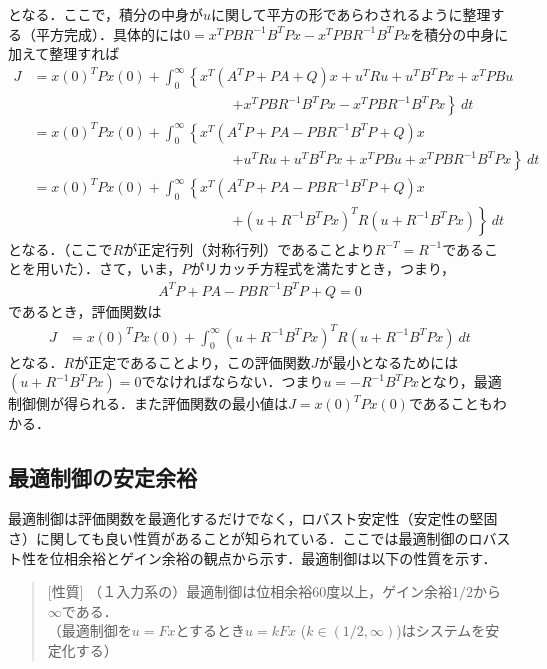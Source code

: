 となる．ここで，積分の中身が$u$に関して平方の形であらわされるように整理する（平方完成）．具体的には$0=x^T P B R^{-1} B^T P x-x^T P B R^{-1} B^T P x$を積分の中身に加えて整理すれば
\begin{align}
	J &= x(0)^T P x(0)
		+ \int_{0}^{\infty} \left \{ x^T(A^T P + PA + Q) x 
		+ u^T R u + u^T B^T P x + x^T P B u 
\right . \nonumber \\ & \hspace{6cm} \left . 
		+x^T P B R^{-1} B^T P x-x^T P B R^{-1} B^T P x \right \} \ dt
\nonumber \\
	&= x(0)^T P x(0)
		+ \int_{0}^{\infty} \left\{ x^T(A^T P + PA - P B R^{-1} B^T P + Q) x 
\right . \nonumber \\ & \hspace{6cm} \left . 
		+ u^T R u + u^T B^T P x + x^T P B u 
		+ x^T P B R^{-1} B^T P x \right\}\ dt
\nonumber \\
	&= x(0)^T P x(0)
		+ \int_{0}^{\infty} \left\{ x^T(A^T P + PA - P B R^{-1} B^T P + Q) x 
\right . \nonumber \\ & \hspace{6cm} \left . 
		+ (u + R^{-1}B^T Px)^T R (u + R^{-1}B^T Px) \right\}\ dt
\end{align}
となる．（ここで$R$が正定行列（対称行列）であることより$R^{-T}= R^{-1}$であることを用いた）．さて，いま，$P$がリカッチ方程式を満たすとき，つまり，
\begin{align}
	A^T P + PA - P B R^{-1} B^T P + Q =0
\nonumber 
\end{align}
であるとき，評価関数は
\begin{align}
	J &= x(0)^T P x(0)
	+ \int_{0}^{\infty} (u + R^{-1}B^T Px)^T R (u + R^{-1}B^T Px) \ dt
\end{align}
となる．$R$が正定であることより，この評価関数$J$が最小となるためには$(u + R^{-1}B^T Px)=0$でなければならない．つまり$u = -R^{-1}B^T P x$となり，最適制御側が得られる．また評価関数の最小値は$J=x(0)^T P x(0)$であることもわかる．

\subsection{最適制御の安定余裕}

最適制御は評価関数を最適化するだけでなく，ロバスト安定性（安定性の堅固さ）に関しても良い性質があることが知られている．ここでは最適制御のロバスト性を位相余裕とゲイン余裕の観点から示す．最適制御は以下の性質を示す．

\begin{quote}
[性質] （１入力系の）最適制御は位相余裕60度以上，ゲイン余裕$1/2$から$\infty$である．\\
（最適制御を$u=Fx$とするとき$u=kFx$ ($k \in (1/2,\infty)$)はシステムを安定化する）
\end{quote}


